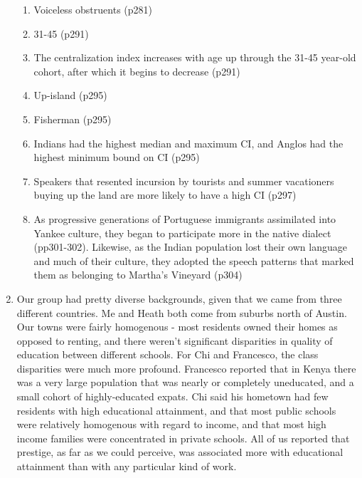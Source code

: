 \documentclass[12pt]{article}
\begin{document}
\begin{enumerate}
          \begin{enumerate}
              \item Voiceless obstruents (p281)
              \item 31-45 (p291)
              \item The centralization index increases with age up through the 31-45 year-old cohort, after which it begins to decrease (p291)
              \item Up-island (p295)
              \item Fisherman (p295)
              \item Indians had the highest median and maximum CI, and Anglos had the highest minimum bound on CI (p295)
              \item Speakers that resented incursion by tourists and summer vacationers buying up the land are more likely to have a high CI (p297)
              \item As progressive generations of Portuguese immigrants assimilated into Yankee culture, they began to participate more in the
                    native dialect (pp301-302). Likewise, as the Indian population lost their own language and much of their culture, they adopted the
                    speech patterns that marked them as belonging to Martha's Vineyard (p304)

          \end{enumerate}

    \item Our group had pretty diverse backgrounds, given that we came from three different countries. Me and Heath both come from suburbs north of
          Austin. Our towns were fairly homogenous - most residents owned their homes as opposed to renting, and there weren't significant disparities in
          quality of education between different schools. For Chi and Francesco, the class disparities were much more profound. Francesco reported that in
          Kenya there was a very large population that was nearly or completely uneducated, and a small cohort of highly-educated expats. Chi said his hometown
          had few residents with high educational attainment, and that most public schools were relatively homogenous with regard to income, and that most
          high income families were concentrated in private schools.
          All of us reported that prestige, as far as we could perceive, was associated more with educational attainment than with any particular kind of work.

\end{enumerate}
\end{document}
